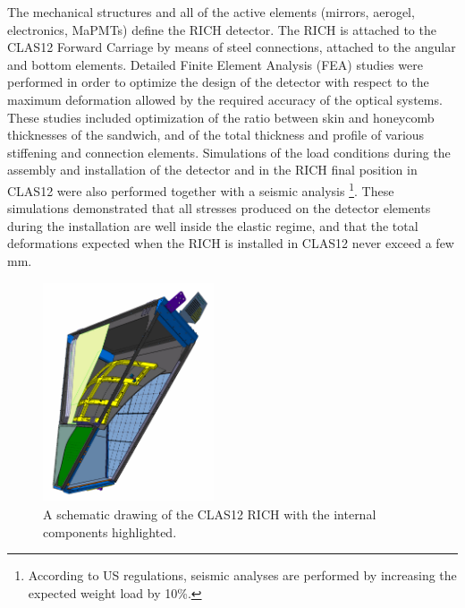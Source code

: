 \documentclass[5p,times,twocolumn]{elsarticle}
\begin{document}
The mechanical structures and all of the active elements (mirrors, aerogel, electronics, MaPMTs) define the RICH
detector. The RICH is attached to the CLAS12 Forward Carriage by means of steel connections, attached to the
angular and bottom elements. Detailed Finite Element Analysis (FEA) studies were performed in order to optimize
the design of the detector with respect to the maximum deformation allowed by the required accuracy of the optical
systems. These studies included optimization of the ratio between skin and honeycomb thicknesses of the sandwich,
and of the total thickness and profile of various stiffening and connection elements. Simulations of the load conditions
during the assembly and installation of the detector and in the RICH final position in CLAS12 were also performed
together with a seismic analysis \footnote{According to US regulations, seismic analyses are performed by increasing
the expected weight load by 10\%.}. These simulations demonstrated that all stresses produced on the detector
elements during the installation are well inside the elastic regime, and that the total deformations expected when the
RICH is installed in CLAS12 never exceed a few mm.

\begin{figure}
\begin{center}
\includegraphics[width=0.45\textwidth]{RICH.pdf}
\caption{A schematic drawing of the CLAS12 RICH with the internal components highlighted.}
\label{Fig:RICHexplo}
\end{center}
\end{figure}

\end{document}
